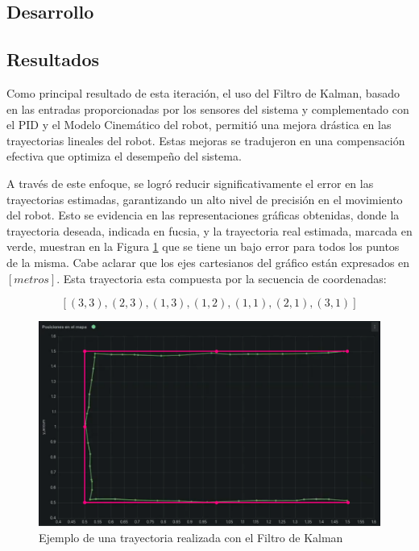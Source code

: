 \subsection{Desarrollo}







\subsection{Resultados}

Como principal resultado de esta iteración, el uso del Filtro de Kalman, basado en las entradas proporcionadas por los sensores del sistema y complementado con el PID y el Modelo Cinemático del robot, permitió una mejora drástica en las trayectorias lineales del robot. Estas mejoras se tradujeron en una compensación efectiva que optimiza el desempeño del sistema.

A través de este enfoque, se logró reducir significativamente el error en las trayectorias estimadas, garantizando un alto nivel de precisión en el movimiento del robot. Esto se evidencia en las representaciones gráficas obtenidas, donde la trayectoria deseada, indicada en fucsia, y la trayectoria real estimada, marcada en verde, muestran en la Figura \ref{fig:ejemplofiltrokalman} que se tiene un bajo error para todos los puntos de la misma. Cabe aclarar que los ejes cartesianos del gráfico están expresados en $[metros]$. Esta trayectoria esta compuesta por la secuencia de coordenadas:

$$ [(3,3), (2,3), (1,3), (1,2), (1,1), (2,1), (3,1)] $$

\begin{figure}[H]
    \centering
    \includegraphics[width=1\linewidth]{images/ejemplo_trayectoria_compensacion_kalman.png}
    \caption{Ejemplo de una trayectoria realizada con el Filtro de Kalman}
    \label{fig:ejemplofiltrokalman}
\end{figure}

